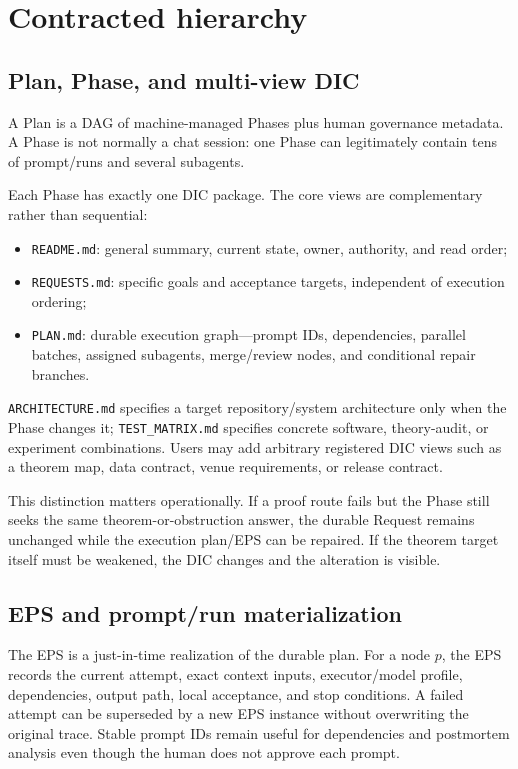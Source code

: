 \documentclass{article}
\begin{document}
\section{Contracted hierarchy}
\subsection{Plan, Phase, and multi-view DIC}
A Plan is a DAG of machine-managed Phases plus human governance metadata. A Phase is not normally a chat session: one Phase can legitimately contain tens of prompt/runs and several subagents.

Each Phase has exactly one DIC package. The core views are complementary rather than sequential:
\begin{itemize}
  \item \texttt{README.md}: general summary, current state, owner, authority, and read order;
  \item \texttt{REQUESTS.md}: specific goals and acceptance targets, independent of execution ordering;
  \item \texttt{PLAN.md}: durable execution graph---prompt IDs, dependencies, parallel batches, assigned subagents, merge/review nodes, and conditional repair branches.
\end{itemize}
\texttt{ARCHITECTURE.md} specifies a target repository/system architecture only when the Phase changes it; \texttt{TEST\_MATRIX.md} specifies concrete software, theory-audit, or experiment combinations. Users may add arbitrary registered DIC views such as a theorem map, data contract, venue requirements, or release contract.

This distinction matters operationally. If a proof route fails but the Phase still seeks the same theorem-or-obstruction answer, the durable Request remains unchanged while the execution plan/EPS can be repaired. If the theorem target itself must be weakened, the DIC changes and the alteration is visible.

\subsection{EPS and prompt/run materialization}
The EPS is a just-in-time realization of the durable plan. For a node $p$, the EPS records the current attempt, exact context inputs, executor/model profile, dependencies, output path, local acceptance, and stop conditions. A failed attempt can be superseded by a new EPS instance without overwriting the original trace. Stable prompt IDs remain useful for dependencies and postmortem analysis even though the human does not approve each prompt.
\end{document}
